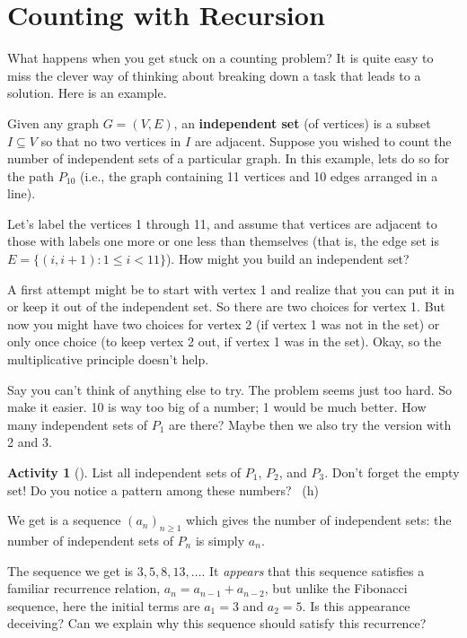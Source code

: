 \documentclass[10pt,]{book}
\newcommand{\terminology}[1]{\textbf{#1}}
\theoremstyle{plain}
\theoremstyle{definition}
\theoremstyle{definition}
\theoremstyle{definition}
\newtheorem{activity}[project]{Activity}
\numberwithin{equation}{chapter}
\def\st{:}
\newcommand{\lt}{<}
\begin{document}
\section[{Counting with Recursion}]{Counting with Recursion}\label{sec_basic-recursion}
\hypertarget{p-879}{}%
What happens when you get stuck on a counting problem?  It is quite easy to miss the clever way of thinking about breaking down a task that leads to a solution.  Here is an example.%
\par
\hypertarget{p-880}{}%
Given any graph \(G = (V, E)\), an \terminology{independent set} (of vertices) is a subset \(I \subseteq V\) so that no two vertices in \(I\) are adjacent.  Suppose you wished to count the number of independent sets of a particular graph.  In this example, lets do so for the path \(P_{10}\) (i.e., the graph containing 11 vertices and 10 edges arranged in a line).%
\par
\hypertarget{p-881}{}%
Let's label the vertices 1 through 11, and assume that vertices are adjacent to those with labels one more or one less than themselves (that is, the edge set is \(E = \{(i,i+1) \st 1 \le i \lt 11\}\)).  How might you build an independent set?%
\par
\hypertarget{p-882}{}%
A first attempt might be to start with vertex 1 and realize that you can put it in or keep it out of the independent set.  So there are two choices for vertex 1.  But now you might have two choices for vertex 2 (if vertex 1 was not in the set) or only once choice (to keep vertex 2 out, if vertex 1 was in the set).  Okay, so the multiplicative principle doesn't help.%
\par
\hypertarget{p-883}{}%
Say you can't think of anything else to try.  The problem seems just too hard.  So make it easier.  10 is way too big of a number; 1 would be much better.  How many independent sets of \(P_1\) are there?  Maybe then we also try the version with 2 and 3.%
\begin{activity}[]\label{activity-125}
\hypertarget{p-884}{}%
List all independent sets of \(P_1\), \(P_2\), and \(P_3\).  Don't forget the empty set! Do you notice a pattern among these numbers?%
~{\tiny (h)}\end{activity}
\hypertarget{p-886}{}%
We get is a sequence \((a_n)_{n \ge 1}\) which gives the number of independent sets: the number of independent sets of \(P_n\) is simply \(a_n\).%
\par
\hypertarget{p-887}{}%
The sequence we get is \(3, 5, 8, 13, \ldots\).  It \emph{appears} that this sequence satisfies a familiar recurrence relation, \(a_n = a_{n-1} + a_{n-2}\), but unlike the Fibonacci sequence, here the initial terms are \(a_1 = 3\) and \(a_2 = 5\).  Is this appearance deceiving?  Can we explain why this sequence should satisfy this recurrence?%
\end{document}
